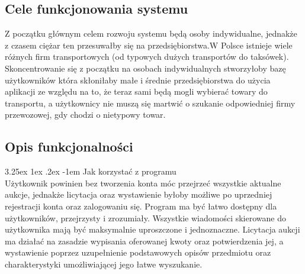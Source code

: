 \documentclass[10pt,titlepage]{article} %
\makeatletter
\renewcommand{\normalsize}{\fontsize{8pt}{10pt}\selectfont} %
\renewcommand\paragraph{\@startsection{paragraph}{5}{\z@}%
  {3.25ex \@plus1ex \@minus.2ex}%
  {-1em}%
  {\normalfont\normalsize\bfseries}}
\makeatother
\begin{document}
\subsection{Cele funkcjonowania systemu}
Z początku głównym celem rozwoju systemu będą osoby indywidualne, jednakże z czasem ciężar ten przesuwałby się na przedsiębiorstwa.W Polsce istnieje wiele różnych firm transportowych (od typowych dużych transportów do taksówek). Skoncentrowanie się z początku na osobach indywidualnych stworzyłoby bazę użytkowników która skłoniłaby małe i średnie przedsiębiorstwa do użycia aplikacji ze względu na to, że teraz sami będą mogli wybierać towary do transportu, a użytkownicy nie muszą się martwić o szukanie odpowiedniej firmy przewozowej, gdy chodzi o nietypowy towar. 



\subsection{Opis funkcjonalności}
\paragraph{Jak korzystać z programu}\mbox{}\\
Użytkownik powinien bez tworzenia konta móc przejrzeć wszystkie aktualne aukcje, jednakże licytacja oraz wystawienie byłoby możliwe po uprzedniej rejestracji konta oraz zalogowaniu się. Program ma być łatwo dostępny dla użytkowników, przejrzysty i zrozumiały. Wszystkie wiadomości skierowane do użytkownika mają być maksymalnie uproszczone i jednoznaczne. Licytacja aukcji ma działać na zasadzie wypisania oferowanej kwoty oraz potwierdzenia jej, a wystawienie poprzez uzupełnienie podstawowych opisów przedmiotu oraz charakterystyki umożliwiającej jego łatwe wyszukanie.
\end{document}
